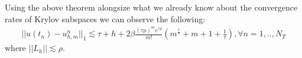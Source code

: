 \begin{corollary}
    Using the above theorem alongsize what we already know about the convergence rates of Krylov subspaces we can observe the following:
    \begin{align*}
        ||u(t_n) - u_{h,m}^n||_1 \lesssim \tau + h + 2\beta \frac{(\tau \rho)^m e^{\tau \rho}}{m!}(m^\frac{1}{\tau} + m + 1 + \frac{1}{\tau}), \forall n = 1,..,N_T
    \end{align*}
    where $||L_h|| \lesssim \rho$.
\end{corollary}